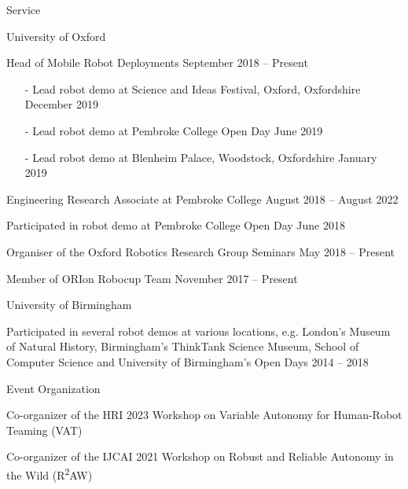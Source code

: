 
\begin{rSection}{Service}

\begin{rSubsection}{University of Oxford}{}{}{}
\item Head of Mobile Robot Deployments \hfill  September 2018 -- Present
\begin{itemize}
\vspace*{-0.2cm}
\item[-]  Lead robot demo at Science and Ideas Festival, Oxford, Oxfordshire \hfill December 2019\vspace*{-0.2cm}
\item[-]  Lead robot demo at Pembroke College Open Day \hfill June 2019\vspace*{-0.2cm}
\item[-]  Lead robot demo at Blenheim Palace, Woodstock, Oxfordshire \hfill January 2019
\end{itemize}
\item Engineering Research Associate at Pembroke College \hfill August 2018 -- August 2022
\item Participated in robot demo at Pembroke College Open Day \hfill June 2018
\item Organiser of the Oxford Robotics Research Group Seminars \hfill May 2018 -- Present
\item Member of ORIon Robocup Team \hfill November 2017 -- Present
\end{rSubsection}


\begin{rSubsection}{University of Birmingham}{}{}{}
\item Participated in several robot demos at various locations, e.g. London's  Museum of Natural History, Birmingham's ThinkTank Science Museum,  School of  Computer Science and University of Birmingham's Open Days  \hspace*{10.2cm}2014 -- 2018
\end{rSubsection}


\begin{rSubsection}{Event Organization}{}{}{}
\item Co-organizer of the HRI 2023 Workshop on Variable Autonomy for Human-Robot Teaming (VAT) 
\item Co-organizer of the IJCAI 2021 Workshop on  Robust and Reliable Autonomy in the Wild (R\textsuperscript{2}AW)
\end{rSubsection}



\end{rSection}
